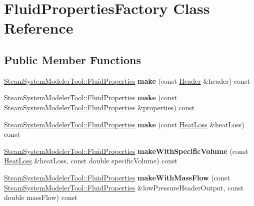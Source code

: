 \hypertarget{class_fluid_properties_factory}{}\section{Fluid\+Properties\+Factory Class Reference}
\label{class_fluid_properties_factory}
\subsection*{Public Member Functions}
\begin{DoxyCompactItemize}
\item 
\mbox{\label{class_fluid_properties_factory_a846d99dff93d2cca276fc00e6d65143a}} 
\hyperlink{struct_steam_system_modeler_tool_1_1_fluid_properties}{Steam\+System\+Modeler\+Tool\+::\+Fluid\+Properties} {\bfseries make} (const \hyperlink{class_header}{Header} \&header) const
\item 
\mbox{\label{class_fluid_properties_factory_ad4f3d4504e5c46fe39da14ac5035291a}} 
\hyperlink{struct_steam_system_modeler_tool_1_1_fluid_properties}{Steam\+System\+Modeler\+Tool\+::\+Fluid\+Properties} {\bfseries make} (const \hyperlink{struct_steam_system_modeler_tool_1_1_fluid_properties}{Steam\+System\+Modeler\+Tool\+::\+Fluid\+Properties} \&properties) const
\item 
\mbox{\label{class_fluid_properties_factory_a6222ece1469cd7b208a90bd65702b431}} 
\hyperlink{struct_steam_system_modeler_tool_1_1_fluid_properties}{Steam\+System\+Modeler\+Tool\+::\+Fluid\+Properties} {\bfseries make} (const \hyperlink{class_heat_loss}{Heat\+Loss} \&heat\+Loss) const
\item 
\mbox{\label{class_fluid_properties_factory_a37d6381e37993134fbbb26436f07cf27}} 
\hyperlink{struct_steam_system_modeler_tool_1_1_fluid_properties}{Steam\+System\+Modeler\+Tool\+::\+Fluid\+Properties} {\bfseries make\+With\+Specific\+Volume} (const \hyperlink{class_heat_loss}{Heat\+Loss} \&heat\+Loss, const double specific\+Volume) const
\item 
\mbox{\label{class_fluid_properties_factory_a7371b3ddc062eaa2d15ff003fd1d1faa}} 
\hyperlink{struct_steam_system_modeler_tool_1_1_fluid_properties}{Steam\+System\+Modeler\+Tool\+::\+Fluid\+Properties} {\bfseries make\+With\+Mass\+Flow} (const \hyperlink{struct_steam_system_modeler_tool_1_1_fluid_properties}{Steam\+System\+Modeler\+Tool\+::\+Fluid\+Properties} \&low\+Pressure\+Header\+Output, const double mass\+Flow) const

\end{DoxyCompactItemize}
